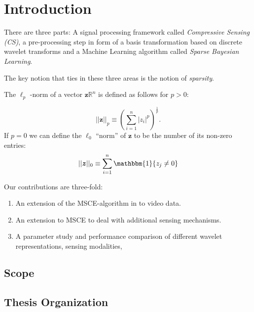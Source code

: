 \chapter{Introduction}

There are three parts: A signal processing framework called \emph{Compressive Sensing (CS)}, a pre-processing step in form of a basis transformation based on discrete wavelet transforms and a Machine Learning algorithm called \emph{Sparse Bayesian Learning}.

The key notion that ties in these three areas is the notion of \emph{sparsity}.

The $\ell_p$ -norm of a vector $\bm z \mathbb{R}^n$ is defined as follows for $p>0$:

\begin{equation}
\label{eqn:lp-norm}
  ||\bm z||_p \equiv \left( \sum_{i=1}^n |z_i|^p \right)^\frac{1}{p}.
\end{equation}
If $p=0$ we can define the $\ell_0$ ``norm'' of $\bm z$ to be the number of its non-zero entries:
\begin{equation}
\label{eqn:l0-norm}
  ||\bm z||_0 \equiv  \sum_{i=1}^n \mathbbm{1}\{z_j \neq 0\}
\end{equation}


Our contributions are three-fold:
\begin{enumerate}
\item An extension of the MSCE-algorithm in \cite{pilikos2014} to video data.
\item An extension to MSCE to deal with additional sensing mechanisms.
\item A parameter study and performance comparison of different wavelet representations, sensing modalities, 
\end{enumerate}


\section*{Scope}
\section*{Thesis Organization}
